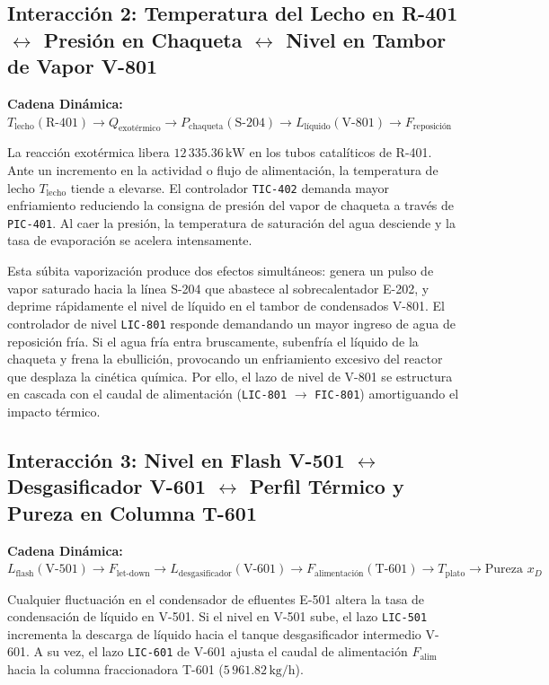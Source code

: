\documentclass[10pt,letterpaper]{article}
\begin{document}
\subsection{Interacción 2: Temperatura del Lecho en R-401 \texorpdfstring{$\longleftrightarrow$}{ <-> } Presión en Chaqueta \texorpdfstring{$\longleftrightarrow$}{ <-> } Nivel en Tambor de Vapor V-801}
\begin{center}
\textbf{Cadena Dinámica:} $T_{\text{lecho}} (\text{R-401}) \longrightarrow Q_{\text{exotérmico}} \longrightarrow P_{\text{chaqueta}} (\text{S-204}) \longrightarrow L_{\text{líquido}} (\text{V-801}) \longrightarrow F_{\text{reposición}}$
\end{center}
La reacción exotérmica libera $12\,335.36\,\text{kW}$ en los tubos catalíticos de R-401. Ante un incremento en la actividad o flujo de alimentación, la temperatura de lecho $T_{\text{lecho}}$ tiende a elevarse. El controlador \texttt{TIC-402} demanda mayor enfriamiento reduciendo la consigna de presión del vapor de chaqueta a través de \texttt{PIC-401}. Al caer la presión, la temperatura de saturación del agua desciende y la tasa de evaporación se acelera intensamente.

Esta súbita vaporización produce dos efectos simultáneos: genera un pulso de vapor saturado hacia la línea S-204 que abastece al sobrecalentador E-202, y deprime rápidamente el nivel de líquido en el tambor de condensados V-801. El controlador de nivel \texttt{LIC-801} responde demandando un mayor ingreso de agua de reposición fría. Si el agua fría entra bruscamente, subenfría el líquido de la chaqueta y frena la ebullición, provocando un enfriamiento excesivo del reactor que desplaza la cinética química. Por ello, el lazo de nivel de V-801 se estructura en cascada con el caudal de alimentación (\texttt{LIC-801} $\to$ \texttt{FIC-801}) amortiguando el impacto térmico.

\subsection{Interacción 3: Nivel en Flash V-501 \texorpdfstring{$\longleftrightarrow$}{ <-> } Desgasificador V-601 \texorpdfstring{$\longleftrightarrow$}{ <-> } Perfil Térmico y Pureza en Columna T-601}
\begin{center}
\textbf{Cadena Dinámica:} $L_{\text{flash}} (\text{V-501}) \longrightarrow F_{\text{let-down}} \longrightarrow L_{\text{desgasificador}} (\text{V-601}) \longrightarrow F_{\text{alimentación}} (\text{T-601}) \longrightarrow T_{\text{plato}} \longrightarrow \text{Pureza } x_D$
\end{center}
Cualquier fluctuación en el condensador de efluentes E-501 altera la tasa de condensación de líquido en V-501. Si el nivel en V-501 sube, el lazo \texttt{LIC-501} incrementa la descarga de líquido hacia el tanque desgasificador intermedio V-601. A su vez, el lazo \texttt{LIC-601} de V-601 ajusta el caudal de alimentación $F_{\text{alim}}$ hacia la columna fraccionadora T-601 ($5\,961.82\,\text{kg/h}$).
\end{document}
